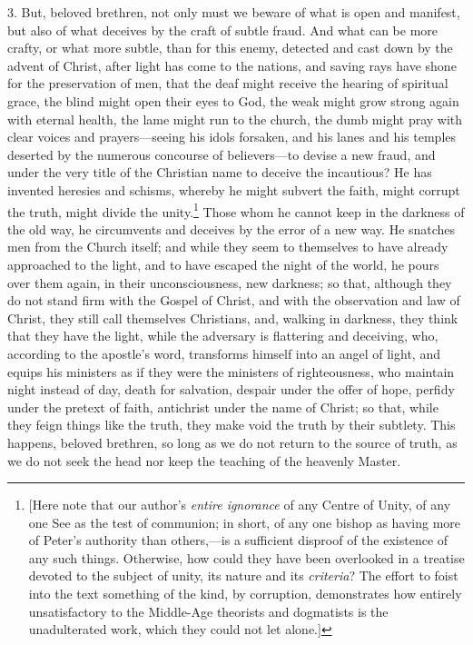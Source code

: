 3. But, beloved brethren, not only must we beware of what is open and manifest, but also of what deceives by the craft of subtle fraud. And what can be more crafty, or what more subtle, than for this enemy, detected and cast down by the advent of Christ, after light has come to the nations, and saving rays have shone for the preservation of men, that the deaf might receive the hearing of spiritual grace, the blind might open their eyes to God, the weak might grow strong again with eternal health, the lame might run to the church, the dumb might pray with clear voices and prayers—seeing his idols forsaken, and his lanes and his temples deserted by the numerous concourse of believers—to devise a new fraud, and under the very title of the Christian name to deceive the incautious? He has invented heresies and schisms, whereby he might subvert the faith, might corrupt the truth, might divide the unity.\footnote{[Here note that our author’s \emph{entire ignorance} of any Centre of Unity, of any one See as the test of communion; in short, of any one bishop as having more of Peter’s authority than others,—is a sufficient disproof of the existence of any such things. Otherwise, how could they have been overlooked in a treatise devoted to the subject of unity, its nature and its \emph{criteria}? The effort to foist into the text something of the kind, by corruption, demonstrates how entirely unsatisfactory to the Middle-Age theorists and dogmatists is the unadulterated work, which they could not let alone.]} Those whom he cannot keep in the darkness of the old way, he circumvents and deceives by the error of a new way. He snatches men from the Church itself; and while they seem to themselves to have already approached to the light, and to have escaped the night of the world, he pours over them again, in their unconsciousness, new darkness; so that, although they do not stand firm with the Gospel of Christ, and with the observation and law of Christ, they still call themselves Christians, and, walking in darkness, they think that they have the light, while the adversary is flattering and deceiving, who, according to the apostle’s word, transforms himself into an angel of light, and equips his ministers as if they were the ministers of righteousness, who maintain night instead of day, death for salvation, despair under the offer of hope, perfidy under the pretext of faith, antichrist under the name of Christ; so that, while they feign things like the truth, they make void the truth by their subtlety. This happens, beloved brethren, so long as we do not return to the source of truth, as we do not seek the head nor keep the teaching of the heavenly Master.

